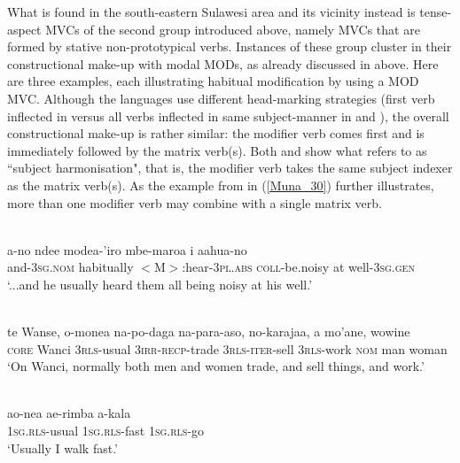 What is found in the south-eastern Sulawesi area and its vicinity instead is tense-aspect MVCs of the second group introduced above, namely MVCs that are formed by stative non-prototypical verbs. Instances of these group cluster in their constructional make-up with modal MODs, as already discussed in  above. Here are three examples, each illustrating habitual modification by using a MOD MVC. Although the languages use different head-marking strategies (first verb inflected in  versus all verbs inflected in same subject-manner in  and ), the overall constructional make-up is rather similar: the modifier verb comes first and is immediately followed by the matrix verb(s). Both  and  show what \citet{vandenberg1989} refers to as ``subject harmonisation", that is, the modifier verb takes the same subject indexer as the matrix verb(s). As the example from  in (\ref{Muna_30}) further illustrates, more than one modifier verb may combine with a single matrix verb.

\ea \label{Tolaki_39}
\\
\gll a-no ndee modea-'iro mbe-maroa i aahua-no\\
and-3\textsc{sg}.\textsc{nom} habitually $<$M$>$:hear-3\textsc{pl}.\textsc{abs} \textsc{coll}-be.noisy at well-3\textsc{sg}.\textsc{gen}\\
\glft `...and he usually heard them all being noisy at his well.'\\
\z

\ea \label{Tukang_62}
\\
\gll te Wanse, o-monea na-po-daga na-para-aso, no-karajaa, a mo'ane, wowine \\
\textsc{core} Wanci 3\textsc{rls}-usual 3\textsc{irr}-\textsc{recp}-trade 3\textsc{rls}-\textsc{iter}-sell 3\textsc{rls}-work \textsc{nom} man woman \\
\glft `On Wanci, normally both men and women trade, and sell things, and work.' \\ 
\z

\ea \label{Muna_30}
\\
\gll ao-nea ae-rimba a-kala \\
1\textsc{sg}.\textsc{rls}-usual 1\textsc{sg}.\textsc{rls}-fast 1\textsc{sg}.\textsc{rls}-go \\
\glft `Usually I walk fast.'\\ 
\z

